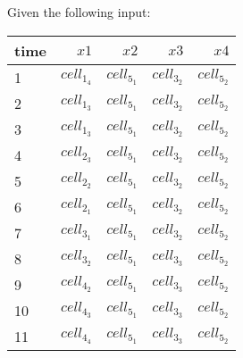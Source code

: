 
Given the following input:
\begin{table}[ht!]
\begin{center}
\begin{tabular}{|l|r|r|r|r|}
\hline
time & $\mathit{x}1$& $\mathit{x}2$& $\mathit{x}3$& $\mathit{x}4$\\
\hline
1 & $\mathit{cell}_1_4$& $\mathit{cell}_5_1$& $\mathit{cell}_3_2$& $\mathit{cell}_5_2$ \\
2 & $\mathit{cell}_1_3$& $\mathit{cell}_5_1$& $\mathit{cell}_3_2$& $\mathit{cell}_5_2$ \\
3 & $\mathit{cell}_1_3$& $\mathit{cell}_5_1$& $\mathit{cell}_3_2$& $\mathit{cell}_5_2$ \\
4 & $\mathit{cell}_2_3$& $\mathit{cell}_5_1$& $\mathit{cell}_3_2$& $\mathit{cell}_5_2$ \\
5 & $\mathit{cell}_2_2$& $\mathit{cell}_5_1$& $\mathit{cell}_3_2$& $\mathit{cell}_5_2$ \\
6 & $\mathit{cell}_2_1$& $\mathit{cell}_5_1$& $\mathit{cell}_3_2$& $\mathit{cell}_5_2$ \\
7 & $\mathit{cell}_3_1$& $\mathit{cell}_5_1$& $\mathit{cell}_3_2$& $\mathit{cell}_5_2$ \\
8 & $\mathit{cell}_3_2$& $\mathit{cell}_5_1$& $\mathit{cell}_3_3$& $\mathit{cell}_5_2$ \\
9 & $\mathit{cell}_4_2$& $\mathit{cell}_5_1$& $\mathit{cell}_3_3$& $\mathit{cell}_5_2$ \\
10 & $\mathit{cell}_4_3$& $\mathit{cell}_5_1$& $\mathit{cell}_3_3$& $\mathit{cell}_5_2$ \\
11 & $\mathit{cell}_4_4$& $\mathit{cell}_5_1$& $\mathit{cell}_3_3$& $\mathit{cell}_5_2$ \\
\hline
\end{tabular}
\end{center}
\end{table}

